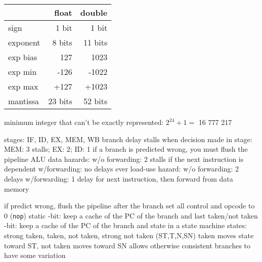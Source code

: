 \documentclass[12pt]{article}
\begin{document}
\begin{spacing}{0.8}
\begin{multicols*}{2}
\begin{flushleft}
\begin{outline}[longenum]
\begin{tabular}{|l r r|}
    $ $      & float   & double  \\ \hline
    sign     & 1 bit   & 1 bit   \\ \hline
    exponent & 8 bits  & 11 bits \\ \hline
    exp bias & 127     & 1023    \\ \hline
    exp min  & -126    & -1022   \\ \hline
    exp max  & +127    & +1023   \\ \hline
    mantissa & 23 bits & 52 bits \\ \hline
  \end{tabular}
  \1 minimum integer that can't be exactly represented: $2^{24} + 1 = $ 16 777 217 



   stages: IF, ID, EX, MEM, WB
  \1 branch delay stalls when decision made in stage:
    \2 MEM: 3 stalls; EX: 2; ID: 1
  \1 if a branch is predicted wrong, you must flush the pipeline
  \1 ALU data hazards:
    \2 w/o forwarding: 2 stalls if the next instruction is dependent
    \2 w/forwarding: no delays ever
  \1 load-use hazard:
    \2 w/o forwarding: 2 delays
    \2 w/forwarding: 1 delay for next instruction, then forward from data memory

  \1 if predict wrong, flush the pipeline after the branch
    \2 set all control and opcode to 0 (\verb|nop|)
  \1 static
  -bit: keep a cache of the PC of the branch and last taken/not taken
  -bit: keep a cache of the PC of the branch and state in a state machine
     states: strong taken, taken, not taken, strong not taken
      (ST,T,N,SN)
    \2 taken moves state toward ST, not taken moves toward SN
    \2 allows otherwise consistent branches to have some variation


\end{outline}
\end{flushleft}
\end{multicols*}
\end{spacing}
\end{document}

